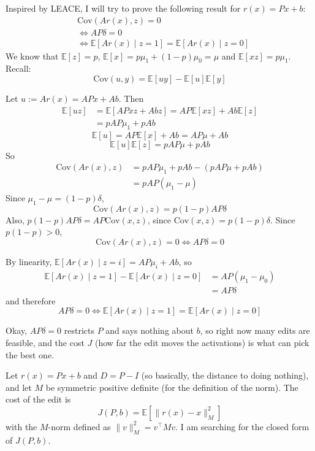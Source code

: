 \documentclass[10pt,a4paper,twocolumn]{article}
\begin{document}
	Inspired by LEACE, I will try to prove the following result for $r(x) = P x + b$:
	$$\begin{aligned}
		& \mathrm{Cov}(A r(x), z) = 0 \\
		& \iff A P \delta = 0 \\
		& \iff \mathbb{E}[A r(x) \mid z = 1] = \mathbb{E}[A r(x) \mid z = 0]
	\end{aligned}$$
	We know that $\mathbb{E}[z] = p$, $\mathbb{E}[x] = p \mu_1 + (1 - p) \mu_0 = \mu$ and $\mathbb{E}[x z] = p \mu_1$. Recall:
	$$\mathrm{Cov}(u, y) = \mathbb{E}[u y] - \mathbb{E}[u] \mathbb{E}[y]$$

	Let $u := A r(x) = A P x + A b$. Then
	$$\begin{aligned}
		\mathbb{E}[u z] & = \mathbb{E}[A P x z + A b z] = A P \mathbb{E}[x z] + A b \mathbb{E}[z] \\
		& = p A P \mu_1 + p A b
	\end{aligned}$$
	$$\mathbb{E}[u] = A P \mathbb{E}[x] + A b = A P \mu + A b$$
	$$\mathbb{E}[u] \mathbb{E}[z] = p A P \mu + p A b$$
	So
	$$\begin{aligned}
		\mathrm{Cov}(A r(x), z) & = p A P \mu_1 + p A b - (p A P \mu + p A b) \\
		& = p A P (\mu_1 - \mu)
	\end{aligned}$$
	Since $\mu_1 - \mu = (1 - p) \delta$,
	$$\mathrm{Cov}(A r(x), z) = p (1 - p) A P \delta$$
	Also, $p (1 - p) A P \delta = A P \mathrm{Cov}(x, z)$, since $\mathrm{Cov}(x, z) = p (1 - p) \delta$. Since $p (1 - p) > 0$,
	$$\mathrm{Cov}(A r(x), z) = 0 \iff A P \delta = 0$$

	By linearity, $\mathbb{E}[A r(x) \mid z = i] = A P \mu_i + A b$, so
	$$\begin{aligned}
		\mathbb{E}[A r(x) \mid z = 1] - \mathbb{E}[A r(x) \mid z = 0] & = A P (\mu_1 - \mu_0) \\
		& = A P \delta
	\end{aligned}$$
	and therefore
	$$A P \delta = 0 \iff \mathbb{E}[A r(x) \mid z = 1] = \mathbb{E}[A r(x) \mid z = 0]$$

	Okay, $A P \delta = 0$ restricts $P$ and says nothing about $b$, so right now many edits are feasible, and the cost $J$ (how far the edit moves the activations) is what can pick the best one.

	Let $r(x) = P x + b$ and $D = P - I$ (so basically, the distance to doing nothing), and let $M$ be symmetric positive definite (for the definition of the norm). The cost of the edit is
	$$J(P, b) = \mathbb{E} \left[ \| r(x) - x \|_M^2 \right]$$
	with the $M$-norm defined as $\| v \|_M^2 = v^\top M v$. I am searching for the closed form of $J(P, b)$.
\end{document}
